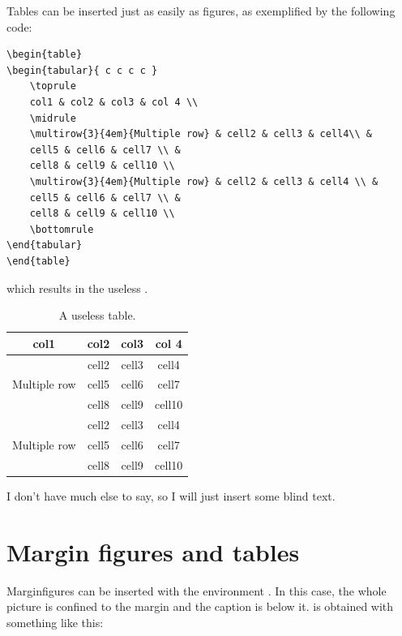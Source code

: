 Tables can be inserted just as easily as figures, as exemplified by the 
following code:

\begin{lstlisting}
\begin{table}
\begin{tabular}{ c c c c }
	\toprule
	col1 & col2 & col3 & col 4 \\
	\midrule
	\multirow{3}{4em}{Multiple row} & cell2 & cell3 & cell4\\ &
	cell5 & cell6 & cell7 \\ &
	cell8 & cell9 & cell10 \\
	\multirow{3}{4em}{Multiple row} & cell2 & cell3 & cell4 \\ &
	cell5 & cell6 & cell7 \\ &
	cell8 & cell9 & cell10 \\
	\bottomrule
\end{tabular}
\end{table}
\end{lstlisting}

which results in the useless .

\begin{table}[b]
\caption[A useless table]{A useless table.}
\begin{tabular}{ c c c c }
	\toprule
	col1 & col2 & col3 & col 4 \\
	\midrule
	\multirow{3}{4em}{Multiple row} & cell2 & cell3 & cell4\\ &
	cell5 & cell6 & cell7 \\ &
	cell8 & cell9 & cell10 \\
	\multirow{3}{4em}{Multiple row} & cell2 & cell3 & cell4 \\ &
	cell5 & cell6 & cell7 \\ &
	cell8 & cell9 & cell10 \\
	\bottomrule
\end{tabular}
\end{table}

I don't have much else to say, so I will just insert some blind text. 
\blindtext

\section{Margin figures and tables}

Marginfigures can be inserted with the environment 
. In this case, the whole picture is confined 
to the margin and the caption is below it.  is 
obtained with something like this:

